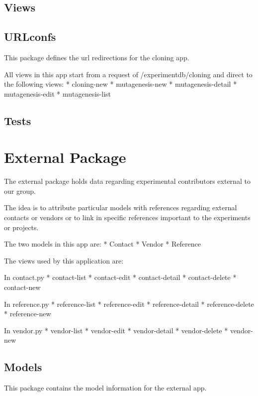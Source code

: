 \documentclass[letterpaper,10pt,english]{sphinxmanual}
\begin{document}
\subsection{Views}
\label{api:id6}\label{api:module-experimentdb.cloning.views}

\subsection{URLconfs}
\label{api:id7}\label{api:module-experimentdb.cloning.urls}
This package defines the url redirections for the cloning app.

All views in this app start from a request of /experimentdb/cloning and direct to the following views:
* cloning-new
* mutagenesis-new
* mutagenesis-detail
* mutagenesis-edit
* mutagenesis-list


\subsection{Tests}
\label{api:id8}

\section{External Package}
\label{api:module-experimentdb.external}\label{api:external-package}
The external package holds data regarding experimental contributors external to our group.

The idea is to attribute particular models with references regarding external contacts or vendors or to link in specific references important to the experiments or projects.

The two models in this app are:
* Contact
* Vendor
* Reference

The views used by this application are:

In contact.py
* contact-list
* contact-edit
* contact-detail
* contact-delete
* contact-new

In reference.py
* reference-list
* reference-edit
* reference-detail
* reference-delete
* reference-new

In vendor.py
* vendor-list
* vendor-edit
* vendor-detail
* vendor-delete
* vendor-new


\subsection{Models}
\label{api:id9}\label{api:module-experimentdb.external.models}
This package contains the model information for the external app.
\end{document}
